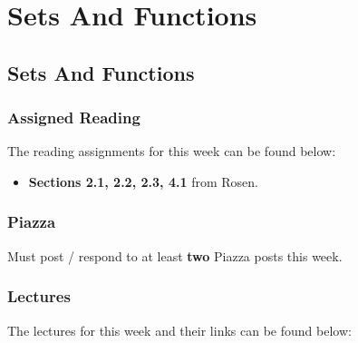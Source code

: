 \clearpage

\renewcommand{\ChapTitle}{Sets And Functions}
\renewcommand{\SectionTitle}{Sets And Functions}

\chapter{\ChapTitle}
\section{\SectionTitle}

\subsection{Assigned Reading}

The reading assignments for this week can be found below:

\begin{itemize}
    \item \textbf{Sections 2.1, 2.2, 2.3, 4.1} from Rosen.
\end{itemize}

\subsection{Piazza}

Must post / respond to at least \textbf{two} Piazza posts this week.  

\subsection{Lectures}

The lectures for this week and their links can be found below:

